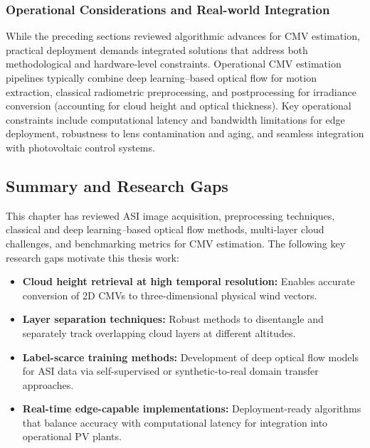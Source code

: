 \subsubsection*{Operational Considerations and Real-world Integration}
While the preceding sections reviewed algorithmic advances for CMV estimation, practical deployment demands integrated solutions that address both methodological and hardware-level constraints. Operational CMV estimation pipelines typically combine deep learning--based optical flow for motion extraction, classical radiometric preprocessing, and postprocessing for irradiance conversion (accounting for cloud height and optical thickness). Key operational constraints include computational latency and bandwidth limitations for edge deployment, robustness to lens contamination and aging, and seamless integration with photovoltaic control systems.


\subsection{Summary and Research Gaps}
This chapter has reviewed ASI image acquisition, preprocessing techniques, classical and deep learning--based optical flow methods, multi-layer cloud challenges, and benchmarking metrics for CMV estimation. The following key research gaps motivate this thesis work:
\begin{itemize}
  \item \textbf{Cloud height retrieval at high temporal resolution:} Enables accurate conversion of 2D CMVs to three-dimensional physical wind vectors.
  \item \textbf{Layer separation techniques:} Robust methods to disentangle and separately track overlapping cloud layers at different altitudes.
  \item \textbf{Label-scarce training methods:} Development of deep optical flow models for ASI data via self-supervised or synthetic-to-real domain transfer approaches.
  \item \textbf{Real-time edge-capable implementations:} Deployment-ready algorithms that balance accuracy with computational latency for integration into operational PV plants.
\end{itemize}
